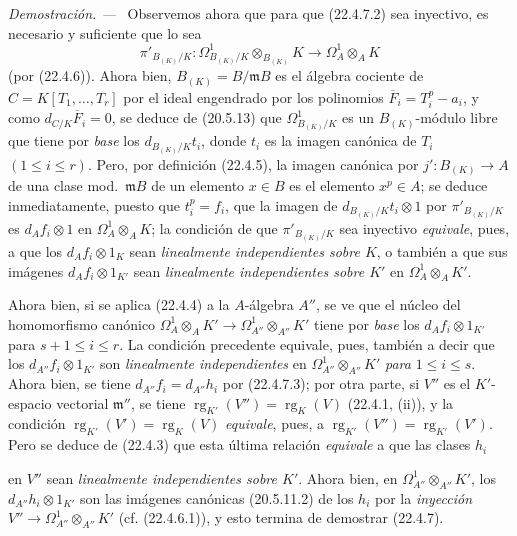 \documentclass[10pt,oneside]{book}
\newcommand{\oldpage}[2][]{%
  \setcounter{footnote}{0}%
  \marginpar{\scriptsize\textbf{#1}~|~#2}\ignorespaces}
\newenvironment{proof}{%
  \par\medskip\noindent\textit{Demostración. ---\ }}{\par}
\providecommand{\setmin}{-}%
\begin{document}
\begin{proof}
Observemos ahora que para que (22.4.7.2) sea inyectivo, es necesario y suficiente
que lo sea
\[
  \pi'_{B_{(K)}/K}:\Omega^1_{B_{(K)}/K}\otimes_{B_{(K)}}K
  \longrightarrow\Omega^1_A\otimes_AK
\]
(por (22.4.6)). Ahora bien, $B_{(K)}=B/\mathfrak mB$ es el álgebra cociente de
$C=K[T_1,\ldots,T_r]$ por el ideal engendrado por los polinomios
$\overline F_i=T_i^p\setmin a_i$, y como $d_{C/K}\overline F_i=0$, se deduce de
(20.5.13) que $\Omega^1_{B_{(K)}/K}$ es un $B_{(K)}$-módulo libre que tiene por
\emph{base} los $d_{B_{(K)}/K}t_i$, donde $t_i$ es la imagen canónica de $T_i$
$(1\leqslant i\leqslant r)$. Pero, por definición (22.4.5), la imagen canónica por
$j':B_{(K)}\longrightarrow A$ de una clase mod.~$\mathfrak mB$ de un elemento
$x\in B$ es el elemento $x^p\in A$; se deduce inmediatamente, puesto que $t_i^p=f_i$,
que la imagen de $d_{B_{(K)}/K}t_i\otimes1$ por $\pi'_{B_{(K)}/K}$ es
$d_Af_i\otimes1$ en $\Omega^1_A\otimes_AK$; la condición de que
$\pi'_{B_{(K)}/K}$ sea inyectivo \emph{equivale}, pues, a que los
$d_Af_i\otimes1_K$ sean \emph{linealmente independientes sobre $K$}, o también
a que sus imágenes $d_Af_i\otimes1_{K'}$ sean \emph{linealmente independientes
sobre $K'$} en $\Omega^1_A\otimes_AK'$.

Ahora bien, si se aplica (22.4.4) a la $A$-álgebra $A''$, se ve que el núcleo del
homomorfismo canónico
$\Omega^1_A\otimes_AK'\longrightarrow\Omega^1_{A''}\otimes_{A''}K'$ tiene por
\emph{base} los $d_Af_i\otimes1_{K'}$ para $s+1\leqslant i\leqslant r$. La condición
precedente equivale, pues, también a decir que los $d_{A''}f_i\otimes1_{K'}$ son
\emph{linealmente independientes} en $\Omega^1_{A''}\otimes_{A''}K'$ \emph{para}
$1\leqslant i\leqslant s$. Ahora bien, se tiene $d_{A''}f_i=d_{A''}h_i$ por (22.4.7.3);
por otra parte, si $V''$ es el $K'$-espacio vectorial $\mathfrak m''$, se tiene
$\operatorname{rg}_{K'}(V'')=\operatorname{rg}_K(V)$ (22.4.1, (ii)), y la condición
$\operatorname{rg}_{K'}(V')=\operatorname{rg}_K(V)$ \emph{equivale}, pues, a
$\operatorname{rg}_{K'}(V'')=\operatorname{rg}_{K'}(V')$. Pero se deduce de (22.4.3) que esta última
relación \emph{equivale} a que las clases $h_i$

\oldpage[0\textsubscript{IV-1}]{200}

en $V''$ sean \emph{linealmente independientes sobre $K'$}. Ahora bien, en
$\Omega^1_{A''}\otimes_{A''}K'$, los $d_{A''}h_i\otimes1_{K'}$ son las imágenes
canónicas (20.5.11.2) de los $h_i$ por la \emph{inyección}
$V''\longrightarrow\Omega^1_{A''}\otimes_{A''}K'$ (cf. (22.4.6.1)), y esto
termina de demostrar (22.4.7).
\end{proof}
\end{document}
